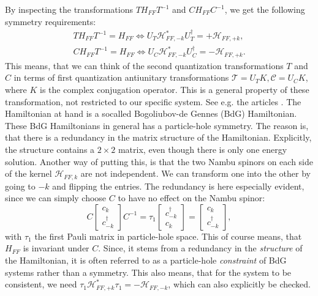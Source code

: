 By inspecting the transformations $TH_{FF}T^{-1}$ and $CH_{FF}C^{-1}$, we get the following symmetry requirements:
\begin{align}
TH_{FF}T^{-1} = H_{FF} \Leftrightarrow U_T\mathcal{H}^*_{FF,-k} U^\dagger_T = + \mathcal{H}_{FF,+k}, \nonumber \\
CH_{FF}T^{-1} = H_{FF} \Leftrightarrow U_C\mathcal{H}^*_{FF,-k} U^\dagger_C = - \mathcal{H}_{FF,+k}. 
\label{eq.Symmetryrequirements}
\end{align}
This means, that we can think of the second quantization transformations $T$ and $C$ in terms of first quantization antiunitary transformations $\mathcal{T} = U_TK, \mathcal{C} = U_CK$, where $K$ is the complex conjugation operator. This is a general property of these transformation, not restricted to our specific system. See e.g. the articles \cite{Ludwig.Topology, Chiu.Topology}. The Hamiltonian at hand is a socalled Bogoliubov-de Gennes (BdG) Hamiltonian. These BdG Hamiltonians in general has a particle-hole symmetry. The reason is, that there is a redundancy in the matrix structure of the Hamiltonian. Explicitly, the structure contains a $2\times 2$ matrix, even though there is only one energy solution. Another way of putting this, is that the two Nambu spinors on each side of the kernel $\mathcal{H}_{FF,k}$ are not independent. We can transform one into the other by going to $-k$ and flipping the entries. The redundancy is here especially evident, since we can simply choose $C$ to have no effect on the Nambu spinor:
\begin{equation}
C \begin{bmatrix} c_k \\ c^\dagger_{-k} \end{bmatrix} C^{-1} =  \tau_1 \begin{bmatrix} c^\dagger_{-k} \\ c_{k} \end{bmatrix} = \begin{bmatrix} c_k \\ c^\dagger_{-k} \end{bmatrix}, 
\end{equation}
with $\tau_1$ the first Pauli matrix in particle-hole space. This of course means, that $H_{FF}$ is invariant under $C$. Since, it stems from a redundancy in the \textit{structure} of the Hamiltonian, it is often referred to as a particle-hole \textit{constraint} of BdG systems rather than a symmetry. This also means, that for the system to be consistent, we need $\tau_1\mathcal{H}^*_{FF,+k} \tau_1 = - \mathcal{H}_{FF,-k}$, which can also explicitly be checked. 

